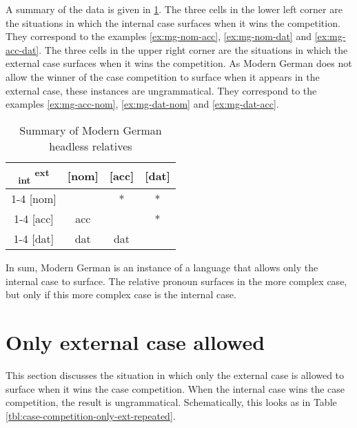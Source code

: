 A summary of the data is given in \ref{tbl:summary-modern-german}.
The three cells in the lower left corner are the situations in which the internal case surfaces when it wins the competition. They correspond to the examples \ref{ex:mg-nom-acc}, \ref{ex:mg-nom-dat} and \ref{ex:mg-acc-dat}.
The three cells in the upper right corner are the situations in which the external case surfaces when it wins the competition. As Modern German does not allow the winner of the case competition to surface when it appears in the external case, these instances are ungrammatical. They correspond to the examples \ref{ex:mg-acc-nom}, \ref{ex:mg-dat-nom} and \ref{ex:mg-dat-acc}.

\begin{table}[H]
  \center
  \caption{Summary of Modern German headless relatives}
  \begin{tabular}{c|c|c|c}
    \toprule
   \textsubscript{\ac{int}} \textsuperscript{\ac{ext}}
          & [\ac{nom}]
          & [\ac{acc}]
          & [\ac{dat}]
          \\ \cmidrule{1-4}
      [\ac{nom}]
          &
          & *
          & *
          \\ \cmidrule{1-4}
      [\ac{acc}]
          & \ac{acc}
          &
          & *
          \\ \cmidrule{1-4}
      [\ac{dat}]
          & \ac{dat}
          & \ac{dat}
          &
          \\
    \bottomrule
  \end{tabular}
  \label{tbl:summary-modern-german}
\end{table}

In sum, Modern German is an instance of a language that allows only the internal case to surface. The relative pronoun surfaces in the more complex case, but only if this more complex case is the internal case.

\section{Only external case allowed}\label{sec:pattern-iii}

This section discusses the situation in which only the external case is allowed to surface when it wins the case competition. When the internal case wins the case competition, the result is ungrammatical. Schematically, this looks as in Table \ref{tbl:case-competition-only-ext-repeated}.

